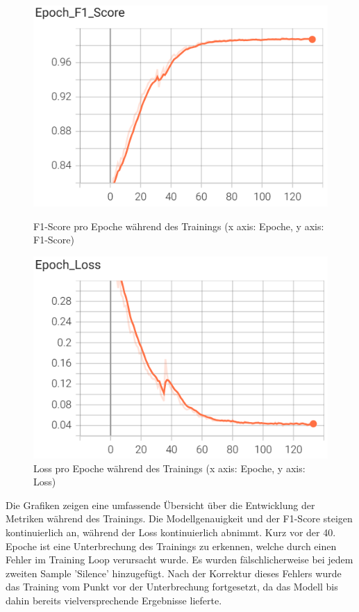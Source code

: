 \documentclass[11pt,a4paper]{article}
\begin{document}
\begin{figure}[H]
    \centering
    \begin{minipage}{0.48\textwidth}
        \includegraphics[width=\textwidth]{img/train/epoch_f1.png}
        \caption{F1-Score pro Epoche während des Trainings (x axis: Epoche, y axis: F1-Score)}
        \label{fig:epoch_f1}
    \end{minipage}\hfill
    \begin{minipage}{0.48\textwidth}
        \includegraphics[width=\textwidth]{img/train/epoch_loss.png}
        \caption{Loss pro Epoche während des Trainings (x axis: Epoche, y axis: Loss)}
        \label{fig:epoch_loss}
    \end{minipage}
\end{figure}


\noindent \newline
Die Grafiken zeigen eine umfassende Übersicht über die Entwicklung der Metriken während des 
Trainings. Die Modellgenauigkeit und der F1-Score steigen kontinuierlich an, während der Loss 
kontinuierlich abnimmt. Kurz vor der 40. Epoche ist eine Unterbrechung des Trainings zu erkennen,
welche durch einen Fehler im Training Loop verursacht wurde. Es wurden fälschlicherweise bei jedem 
zweiten Sample 'Silence' hinzugefügt. Nach der Korrektur dieses Fehlers wurde das Training vom 
Punkt vor der Unterbrechung fortgesetzt, da das Modell bis dahin bereits vielversprechende 
Ergebnisse lieferte.
\end{document}
